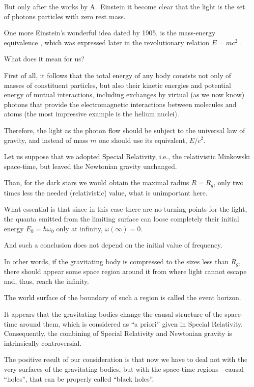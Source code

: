 But only after the works by A.~Einstein \cite{berez:E2, berez:E3} it become clear that the light is the set of photons particles with zero rest mass. 

One more Einstein's wonderful idea dated by 1905, is the mass-energy equivalence \cite{berez:E4},  which was expressed later in the revolutionary relation $E = m c^2$ \cite{berez:E5}. 

What does it mean for us? 

First of all, it follows that the total energy of any body consists not only of masses of constituent particles, but also their kinetic energies and potential energy of mutual interactions, including exchanges by virtual (as we now know) photons that provide the electromagnetic interactions between molecules and atoms (the most impressive example is the helium nuclei). 

Therefore, the light as the photon flow should be subject to the universal law of gravity, and instead of mass $m$ one should use its equivalent, ${E}/{c^2}$. 



Let us suppose that we adopted  Special Relativity, i.e., the relativistic Min\-kowski space-time, but leaved the Newtonian gravity unchanged. 

Than, for the dark stars we would obtain the maximal radius $R = R_g$, only two times less the needed (relativistic) value, what is unimportant here. 

What essential is that since in this case there are no turning points for the light, the quanta emitted from the limiting surface can loose completely their initial energy $E_0 = \hbar \omega _0$ only at infinity, $\omega (\infty) = 0$. 

And such a conclusion does not depend on the initial value of frequency. 

In other words, if the gravitating body is compressed to the sizes less than $R_g$, there should appear some space region around it from where light cannot escape and, thus, reach the infinity. 

The world surface of the boundary of such a region is called the event horizon. 

It appears that the gravitating bodies change the causal structure of the space-time around them, which is considered as ``a priori'' given in Special Relativity. Consequently, the combining of Special Relativity and Newtonian gravity is intrinsically controversial. 

The positive result of our consideration is that now we have to deal not with the very surfaces of the gravitating bodies, but with the space-time regions---causal ``holes'', that can be properly called ``black holes''.



